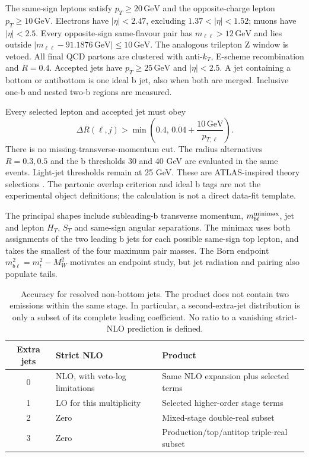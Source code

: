 \documentclass[11pt,a4paper]{article}
\newcommand{\GeV}{\,\mathrm{GeV}}
\begin{document}
The same-sign leptons satisfy $p_T\geq20\GeV$ and the opposite-charge
lepton $p_T\geq10\GeV$. Electrons have $|\eta|<2.47$, excluding
$1.37<|\eta|<1.52$; muons have $|\eta|<2.5$.
Every opposite-sign same-flavour pair has $m_{\ell\ell}>12\GeV$ and lies
outside $|m_{\ell\ell}-91.1876\GeV|\leq10\GeV$. The analogous
trilepton Z window is vetoed. All final QCD partons are clustered with
anti-$k_T$, E-scheme recombination and $R=0.4$. Accepted jets have
$p_T\geq25\GeV$ and $|\eta|<2.5$. A jet containing a bottom or
antibottom is one ideal b jet, also when both are merged. Inclusive one-b
and nested two-b regions are measured.

Every selected lepton and accepted jet must obey
\begin{equation}
\Delta R(\ell,j)>\min\left(0.4,\,0.04+\frac{10\GeV}{p_{T,\ell}}\right).
\end{equation}
There is no missing-transverse-momentum cut. The radius alternatives
$R=0.3,0.5$ and the b thresholds 30 and 40 GeV are evaluated in the
same events. Light-jet thresholds remain at 25 GeV.
These are ATLAS-inspired theory selections \cite{ATLAS2024}.
The partonic overlap criterion and ideal b tags are not the experimental
object definitions; the calculation is not a direct data-fit template.

The principal shapes include subleading-b transverse momentum,
$m_{b\ell}^{\rm minimax}$, jet and lepton $H_T$, $S_T$ and same-sign
angular separations. The minimax uses both assignments of the two leading
b jets for each possible same-sign top lepton, and takes the smallest of
the four maximum pair masses. The Born endpoint
$m_{b\ell}^2=m_t^2-M_W^2$ motivates an endpoint study, but jet radiation
and pairing also populate tails.

\begin{table}[t]
\centering\small
\begin{tabular}{c>{\raggedright\arraybackslash}p{.35\linewidth}>{\raggedright\arraybackslash}p{.39\linewidth}}
\toprule
Extra jets & Strict NLO & Product\\
\midrule
0 & NLO, with veto-log limitations & Same NLO expansion plus selected terms\\
1 & LO for this multiplicity & Selected higher-order stage terms\\
2 & Zero & Mixed-stage double-real subset\\
3 & Zero & Production/top/antitop triple-real subset\\
\bottomrule
\end{tabular}
\caption{Accuracy for resolved non-bottom jets. The product does not
contain two emissions within the same stage. In particular, a second-extra-jet
distribution is only a subset of its complete leading coefficient.
No ratio to a vanishing strict-NLO prediction is defined.}
\label{tab:jets}
\end{table}
\end{document}
